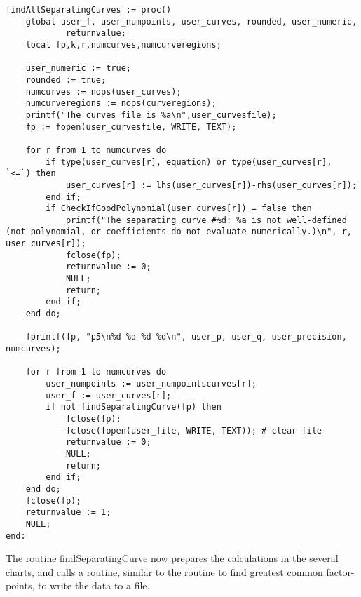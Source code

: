 \documentclass[a4paper,10pt]{article}
\begin{document}
\begin{lstlisting}[name=separatingcurves]
findAllSeparatingCurves := proc()
    global user_f, user_numpoints, user_curves, rounded, user_numeric,
            returnvalue;
    local fp,k,r,numcurves,numcurveregions;

    user_numeric := true;
    rounded := true;
    numcurves := nops(user_curves);
    numcurveregions := nops(curveregions);
    printf("The curves file is %a\n",user_curvesfile);
    fp := fopen(user_curvesfile, WRITE, TEXT);

    for r from 1 to numcurves do
        if type(user_curves[r], equation) or type(user_curves[r], `<=`) then
            user_curves[r] := lhs(user_curves[r])-rhs(user_curves[r]);
        end if;
        if CheckIfGoodPolynomial(user_curves[r]) = false then
            printf("The separating curve #%d: %a is not well-defined (not polynomial, or coefficients do not evaluate numerically.)\n", r, user_curves[r]);
            fclose(fp);
            returnvalue := 0;
            NULL;
            return;
        end if;
    end do;

    fprintf(fp, "p5\n%d %d %d %d\n", user_p, user_q, user_precision, numcurves);

    for r from 1 to numcurves do
        user_numpoints := user_numpointscurves[r];
        user_f := user_curves[r];
        if not findSeparatingCurve(fp) then
            fclose(fp);
            fclose(fopen(user_file, WRITE, TEXT)); # clear file
            returnvalue := 0;
            NULL;
            return;
        end if;
    end do;
    fclose(fp);
    returnvalue := 1;
    NULL;
end:
\end{lstlisting}

The routine findSeparatingCurve now prepares the calculations in the several
charts, and calls a routine, similar to the routine to find greatest common
factor-points, to write the data to a file.
\end{document}
